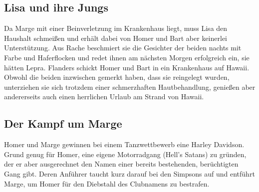 
	
\subsection{Lisa und ihre Jungs}
Da Marge mit einer Beinverletzung im Krankenhaus liegt, muss Lisa den Haushalt schmeißen und erhält dabei von Homer und Bart aber keinerlei Unter\-stütz\-ung. Aus Rache beschmiert sie die Gesichter der beiden nachts mit Farbe und Haferflocken und redet ihnen am nächsten Morgen erfolgreich ein, sie hätten Lepra. Flanders schickt Homer und Bart in ein Krankenhaus auf Hawaii. Obwohl die beiden inzwischen gemerkt haben, dass sie reingelegt wurden, unterziehen sie sich trotzdem einer schmerzhaften Hautbehandlung, genießen aber andererseits auch einen herrlichen Urlaub am Strand von Hawaii.



	
\subsection{Der Kampf um Marge}\label{BABF05}
Homer und Marge gewinnen bei einem Tanzwettbewerb eine Harley Davidson. Grund genug für Homer, eine eigene Motorradgang (Hell's Satans) zu gründen, der er aber ausgerechnet den Namen einer bereits bestehenden, berüchtigten Gang gibt. Deren Anführer taucht kurz darauf bei den Simpsons auf und ent\-führt Marge, um Homer für den Diebstahl des Clubnamens zu bestrafen.

